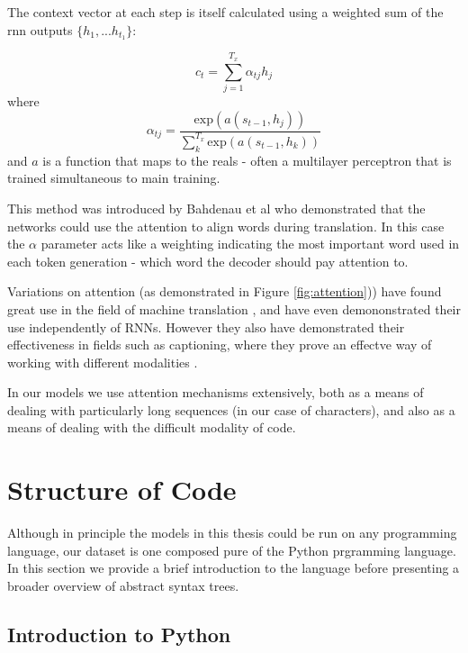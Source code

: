 The context vector at each step is itself calculated using a weighted sum of the rnn outputs $\{h_1,... h_{t_1}\}$:

\begin{equation}
c_t = \sum_{j=1}^{T_x}\alpha_{tj}h_j
\end{equation}
where
\begin{equation}
\alpha_{tj} = \dfrac{\text{exp}(a(s_{t-1}, h_j))}{\sum_k^{T_x}\text{exp}(a(s_{t-1}, h_k))}
\end{equation}
and $a$ is a function that maps to the reals - often a multilayer perceptron that is trained simultaneous to main training. 





This method was introduced by Bahdenau et al \cite{bahdanau_neural_2014} who demonstrated that the networks could use the attention to align words during translation.
In this case the $\alpha$ parameter acts like a weighting indicating the most important word used in each token generation - which word the decoder should pay attention to.

Variations on attention (as demonstrated in Figure \ref{fig:attention})) have found great use in the field of machine translation  \cite{luong_effective_2015}, and have even demononstrated their use independently of RNNs\cite{vaswani_attention_2017}.  However they also have demonstrated their effectiveness in fields such as captioning, where they prove an effectve way of working with different modalities \cite{xu_show_2015}.

In our models we use attention mechanisms extensively, both as a means of dealing with particularly long sequences (in our case of characters), and also as a means of dealing with the difficult modality of code.




\section{Structure of Code} %
\label{sec:translating_code}

Although in principle the models in this thesis could be run on any programming language, our dataset is one composed pure of the Python prgramming language.  
In this section we provide a brief introduction to the language before presenting a broader overview of abstract syntax trees.

\subsection{Introduction to Python} %
\label{sub:python}


